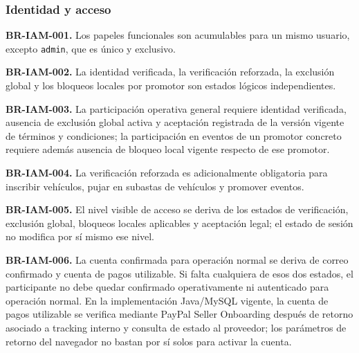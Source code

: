 \documentclass[10pt,letterpaper]{article}
\begin{document}
\subsubsection{Identidad y acceso}
\noindent\textbf{BR-IAM-001.} Los papeles funcionales son acumulables para un mismo usuario, excepto \texttt{admin}, que es único y exclusivo.\par
\noindent\textbf{BR-IAM-002.} La identidad verificada, la verificación reforzada, la exclusión global y los bloqueos locales por promotor son estados lógicos independientes.\par
\noindent\textbf{BR-IAM-003.} La participación operativa general requiere identidad verificada, ausencia de exclusión global activa y aceptación registrada de la versión vigente de términos y condiciones; la participación en eventos de un promotor concreto requiere además ausencia de bloqueo local vigente respecto de ese promotor.\par
\noindent\textbf{BR-IAM-004.} La verificación reforzada es adicionalmente obligatoria para inscribir vehículos, pujar en subastas de vehículos y promover eventos.\par
\noindent\textbf{BR-IAM-005.} El nivel visible de acceso se deriva de los estados de verificación, exclusión global, bloqueos locales aplicables y aceptación legal; el estado de sesión no modifica por sí mismo ese nivel.\par
\noindent\textbf{BR-IAM-006.} La cuenta confirmada para operación normal se deriva de correo confirmado y cuenta de pagos utilizable. Si falta cualquiera de esos dos estados, el participante no debe quedar confirmado operativamente ni autenticado para operación normal. En la implementación Java/MySQL vigente, la cuenta de pagos utilizable se verifica mediante PayPal Seller Onboarding después de retorno asociado a tracking interno y consulta de estado al proveedor; los parámetros de retorno del navegador no bastan por sí solos para activar la cuenta.\par
\end{document}
